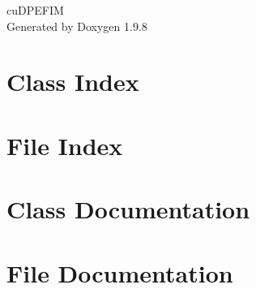 \documentclass[twoside]{book}
\newcommand{\+}{\discretionary{\mbox{\scriptsize$\hookleftarrow$}}{}{}}
\newcommand{\clearemptydoublepage}{%
    \newpage{\pagestyle{empty}\cleardoublepage}%
  }
\begin{document}
  \raggedbottom
    \hypersetup{pageanchor=false,
                bookmarksnumbered=true,
                pdfencoding=unicode
               }
  \begin{titlepage}
  \vspace*{7cm}
  \begin{center}%
  {\Large cu\+DPEFIM}\\
  \vspace*{1cm}
  {\large Generated by Doxygen 1.9.8}\\
  \end{center}
  \end{titlepage}
  \clearemptydoublepage
  \tableofcontents
  \clearemptydoublepage
  \hypersetup{pageanchor=true}
\chapter{Class Index}

\chapter{File Index}

\chapter{Class Documentation}








\chapter{File Documentation}


















  \backmatter
  \newpage
  \clearemptydoublepage
  \printindex
\end{document}
